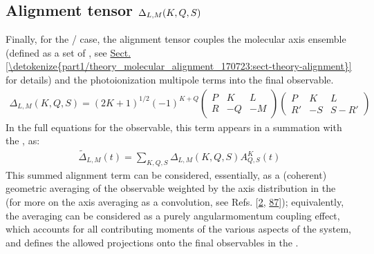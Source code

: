 \documentclass[letterpaper,table,10pt,english]{jupyterBook}
\begin{document}
\subsection{Alignment tensor \protect\(\Delta_{L,M}(K,Q,S)\protect\)}
\label{\detokenize{part1/theory_tensor_formalism_160723:alignment-tensor-delta-l-m-k-q-s}}\label{\detokenize{part1/theory_tensor_formalism_160723:sec-theory-af-alignment-term}}
\sphinxAtStartPar
Finally, for the {\hyperref[\detokenize{backmatter/glossary:term-LF}]{}}/{\hyperref[\detokenize{backmatter/glossary:term-AF}]{}} case, the alignment tensor couples the molecular axis ensemble (defined as a set of {\hyperref[\detokenize{backmatter/glossary:term-ADMs}]{}}, see \hyperref[\detokenize{part1/theory_molecular_alignment_170723:sect-theory-alignment}]{Sect.\@ \ref{\detokenize{part1/theory_molecular_alignment_170723:sect-theory-alignment}}} for details) and the photoionization multipole terms into the final observable.
\begin{equation}\label{equation:part1/theory_tensor_formalism_160723:eq:basis-alignmentTensor-defn}
\begin{split}
\Delta_{L,M}(K,Q,S)=(2K+1)^{1/2}(-1)^{K+Q}\left(\begin{array}{ccc}
P & K & L\\
R & -Q & -M
\end{array}\right)\left(\begin{array}{ccc}
P & K & L\\
R' & -S & S-R'
\end{array}\right)
\end{split}
\end{equation}
\sphinxAtStartPar
In the full equations for the observable, this term appears in a summation with the {\hyperref[\detokenize{backmatter/glossary:term-ADMs}]{}}, as:
\begin{equation}\label{equation:part1/theory_tensor_formalism_160723:eq:basis-aligmentTerm-defn}
\begin{split}
\tilde{\Delta}_{L,M}(t) = \sum_{K,Q,S}\Delta_{L,M}(K,Q,S)A_{Q,S}^{K}(t)
\end{split}
\end{equation}
\sphinxAtStartPar
This summed alignment term can be considered, essentially, as a (coherent) geometric averaging of the {\hyperref[\detokenize{backmatter/glossary:term-MF}]{}} observable weighted by the axis distribution in the {\hyperref[\detokenize{backmatter/glossary:term-AF}]{}} (for more on the axis averaging as a convolution, see Refs. {[}\hyperlink{cite.backmatter/bibliography:id663}{2}, \hyperlink{cite.backmatter/bibliography:id916}{87}{]}); equivalently, the averaging can be considered as a purely angular\sphinxhyphen{}momentum coupling effect, which accounts for all contributing moments of the various aspects of the system, and defines the allowed projections onto the final observables in the {\hyperref[\detokenize{backmatter/glossary:term-LF}]{}}.
\end{document}
